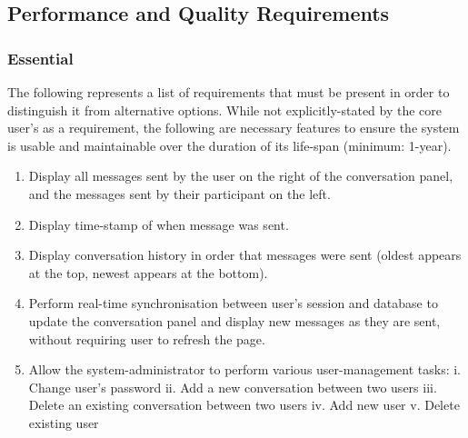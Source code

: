 \documentclass[11pt]{article}
\begin{document}
\subsection{Performance and Quality Requirements}
\subsubsection{Essential}
The following represents a list of requirements that must be present in order to distinguish it from
alternative options. While not explicitly-stated by the core user's as a requirement, the following
are necessary features to ensure the system is usable and maintainable over the duration of its
life-span (minimum: 1-year).
\begin{enumerate}
    \item Display all messages sent by the user on the right of the conversation panel, and
        the messages sent by their participant on the left.
    \item Display time-stamp of when message was sent.
    \item Display conversation history in order that messages were sent (oldest appears at the top,
        newest appears at the bottom).
    \item Perform real-time synchronisation between user's session and database to update the
        conversation panel and display new messages as they are sent, without requiring user to
        refresh the page.
    \item Allow the system-administrator to perform various user-management tasks:
        \subitem i. Change user's password
        \subitem ii. Add a new conversation between two users
        \subitem iii. Delete an existing conversation between two users
        \subitem iv. Add new user
        \subitem v. Delete existing user
\end{enumerate}
\end{document}
